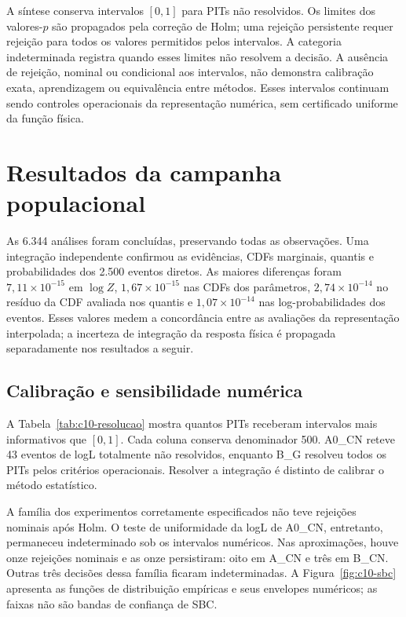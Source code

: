 A síntese conserva intervalos $[0,1]$ para PITs não resolvidos. Os limites
dos valores-$p$ são propagados pela correção de Holm; uma rejeição
persistente requer rejeição para todos os valores permitidos pelos
intervalos. A categoria indeterminada registra quando esses limites não
resolvem a decisão. A ausência de rejeição, nominal ou condicional aos
intervalos, não demonstra calibração exata, aprendizagem ou equivalência
entre métodos. Esses intervalos continuam sendo controles operacionais
da representação numérica, sem certificado uniforme da função física.

\section{Resultados da campanha populacional}

As 6.344 análises foram concluídas, preservando todas as observações.
Uma integração independente confirmou as evidências, CDFs marginais,
quantis e probabilidades dos 2.500 eventos diretos. As maiores diferenças
foram $7{,}11\times10^{-15}$ em $\log Z$,
$1{,}67\times10^{-15}$ nas CDFs dos parâmetros,
$2{,}74\times10^{-14}$ no resíduo da CDF avaliada nos quantis e
$1{,}07\times10^{-14}$ nas log-probabilidades dos eventos.
Esses valores medem a concordância entre as avaliações da representação
interpolada; a incerteza de integração da resposta física é propagada
separadamente nos resultados a seguir.

\subsection{Calibração e sensibilidade numérica}

A Tabela~\ref{tab:c10-resolucao} mostra quantos PITs receberam intervalos
mais informativos que $[0,1]$. Cada coluna conserva denominador 500.
A0\_CN reteve 43 eventos de logL totalmente não resolvidos, enquanto
B\_G resolveu todos os PITs pelos critérios operacionais. Resolver a
integração é distinto de calibrar o método estatístico.

\begin{table}[htbp]
\centering
\caption{PITs com intervalo operacional diferente de $[0,1]$, dentre 500
realizações por método e estatística. Os demais permanecem na síntese.}
\label{tab:c10-resolucao}

\end{table}

A família dos experimentos corretamente especificados não teve rejeições
nominais após Holm. O teste de uniformidade da logL de A0\_CN, entretanto,
permaneceu indeterminado sob os intervalos numéricos. Nas aproximações,
houve onze rejeições nominais e as onze persistiram: oito em A\_CN e três
em B\_CN. Outras três decisões dessa família ficaram indeterminadas.
A Figura~\ref{fig:c10-sbc} apresenta as funções de distribuição empíricas
e seus envelopes numéricos; as faixas não são bandas de confiança de SBC.

